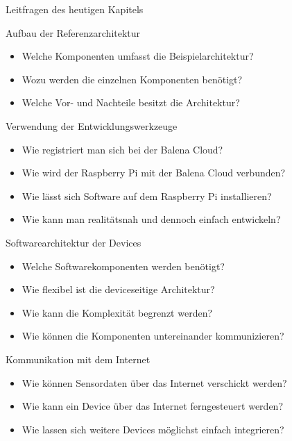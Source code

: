 {
\scriptsize

\begin{frame}{Leitfragen des heutigen Kapitels}
    \begin{block}{Aufbau der Referenzarchitektur}
        \begin{itemize}
            \setlength\itemsep{.5em}

            \item Welche Komponenten umfasst die Beispielarchitektur?
            \item Wozu werden die einzelnen Komponenten benötigt?
            \item Welche Vor- und Nachteile besitzt die Architektur?
        \end{itemize}
    \end{block}

    \begin{block}{Verwendung der Entwicklungswerkzeuge}
        \begin{itemize}
            \setlength\itemsep{.5em}

            \item Wie registriert man sich bei der Balena Cloud?
            \item Wie wird der Raspberry Pi mit der Balena Cloud verbunden?
            \item Wie lässt sich Software auf dem Raspberry Pi installieren?
            \item Wie kann man realitätsnah und dennoch einfach entwickeln?
        \end{itemize}
    \end{block}

    \begin{block}{Softwarearchitektur der Devices}
        \begin{itemize}
            \setlength\itemsep{.5em}

            \item Welche Softwarekomponenten werden benötigt?
            \item Wie flexibel ist die deviceseitige Architektur?
            \item Wie kann die Komplexität begrenzt werden?
            \item Wie können die Komponenten untereinander kommunizieren?
        \end{itemize}
    \end{block}

    \begin{block}{Kommunikation mit dem Internet}
        \begin{itemize}
            \setlength\itemsep{.5em}

            \item Wie können Sensordaten über das Internet verschickt werden?
            \item Wie kann ein Device über das Internet ferngesteuert werden?
            \item Wie lassen sich weitere Devices möglichst einfach integrieren?
        \end{itemize}
    \end{block}
\end{frame}
}

